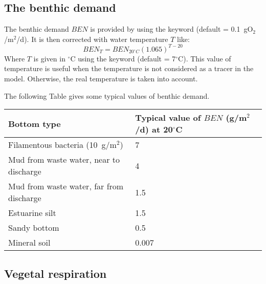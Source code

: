 \subsection{The benthic demand}

The benthic demand $BEN$ is provided by 
using the keyword  (default = 0.1~gO$_2$/m$^2$/d).
It is then corrected with water temperature $T$ like:
\[{BEN}_T={BEN}_{20^\circ C}{\left(1.065\right)}^{T-20}\]
Where $T$ is given in $^{\circ}$C using the keyword 
(default = 7$^\circ$C).
This value of temperature is useful when the temperature is not considered
as a tracer in the model.
Otherwise, the real temperature is taken into account.

The following Table gives some typical values of benthic demand.\\

\begin{table}[H]
 			\centering
\begin{tabular}{p{3.0in}p{3.0in}}
\hline
\multicolumn{1}{|p{3.0in}}{Bottom type} & 
\multicolumn{1}{|p{3.0in}|}{Typical value of $BEN$ (g/m$^2$/d) at 20$^{\circ}$C} \\
\hline
\multicolumn{1}{|p{3.0in}}{Filamentous bacteria (10~g/m$^2$)} & 
\multicolumn{1}{|p{3.0in}|}{7} \\
\hline
\multicolumn{1}{|p{3.0in}}{Mud from waste water, near to discharge} & 
\multicolumn{1}{|p{3.0in}|}{4} \\
\hline
\multicolumn{1}{|p{3.0in}}{Mud from waste water, far from discharge } & 
\multicolumn{1}{|p{3.0in}|}{1.5} \\
\hline
\multicolumn{1}{|p{3.0in}}{Estuarine silt} & 
\multicolumn{1}{|p{3.0in}|}{1.5} \\
\hline
\multicolumn{1}{|p{3.0in}}{Sandy bottom} & 
\multicolumn{1}{|p{3.0in}|}{0.5} \\
\hline
\multicolumn{1}{|p{3.0in}}{Mineral soil} & 
\multicolumn{1}{|p{3.0in}|}{0.007} \\
\hline

\end{tabular}
\end{table}


\subsection{Vegetal respiration}

